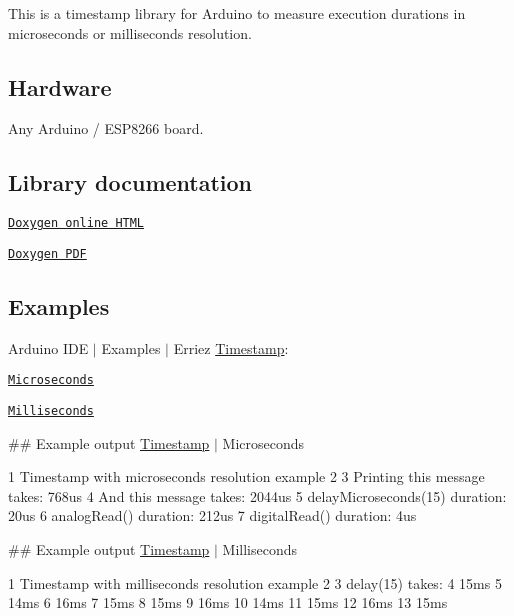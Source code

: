 \href{https://travis-ci.org/Erriez/ErriezTimestamp}{\tt }

This is a timestamp library for Arduino to measure execution durations in microseconds or milliseconds resolution.



\subsection*{Hardware}

Any Arduino / E\+S\+P8266 board.

\subsection*{Library documentation}


\begin{DoxyItemize}
\item \href{https://Erriez.github.io/ErriezTimestamp}{\tt Doxygen online H\+T\+ML}
\item \href{https://github.com/Erriez/ErriezTimestamp/raw/gh-pages/latex/ErriezTimestamp.pdf}{\tt Doxygen P\+DF}
\end{DoxyItemize}

\subsection*{Examples}

Arduino I\+DE $\vert$ Examples $\vert$ Erriez \hyperlink{class_timestamp}{Timestamp}\+:


\begin{DoxyItemize}
\item \href{https://github.com/Erriez/ErriezTimestamp/blob/master/examples/Microseconds/Microseconds.ino}{\tt Microseconds}
\item \href{https://github.com/Erriez/ErriezTimestamp/blob/master/examples/Milliseconds/Milliseconds.ino}{\tt Milliseconds}
\end{DoxyItemize}

\#\# Example output \hyperlink{class_timestamp}{Timestamp} $\vert$ Microseconds 
\begin{DoxyCode}
1 Timestamp with microseconds resolution example
2 
3 Printing this message takes: 768us
4 And this message takes: 2044us
5 delayMicroseconds(15) duration: 20us
6 analogRead() duration: 212us
7 digitalRead() duration: 4us
\end{DoxyCode}


\#\# Example output \hyperlink{class_timestamp}{Timestamp} $\vert$ Milliseconds 
\begin{DoxyCode}
1 Timestamp with milliseconds resolution example
2 
3 delay(15) takes:
4 15ms
5 14ms
6 16ms
7 15ms
8 15ms
9 16ms
10 14ms
11 15ms
12 16ms
13 15ms
\end{DoxyCode}


